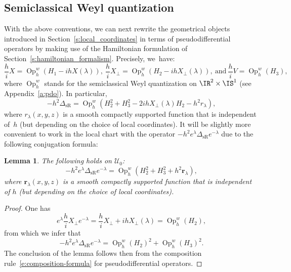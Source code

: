\documentclass[10pt]{amsart}
\theoremstyle{plain}
\newtheorem{lemm}[theo]{Lemma}
\theoremstyle{definition}
\theoremstyle{remark}
\newcommand{\Op}{\operatorname{Op}}
\begin{document}
\subsection{Semiclassical Weyl quantization}\label{ss:weyl-operators}

With the above conventions, we can next rewrite the geometrical objects introduced in Section~\ref{s:local_coordinates} in terms of pseudodifferential operators by making use of the Hamiltonian formulation of Section~\ref{s:hamiltonian_formalism}. Precisely, we~have:
\[
\frac{h}{i}X=\Op_h^w(H_1-ih X(\lambda)),\ \frac{h}{i}X_\perp=\Op_h^w(H_2-ihX_\perp(\lambda)),\ \text{and}\ \frac{h}{i}V=\Op_h^w(H_3),
\]
where $\Op_h^w$ stands for the semiclassical Weyl quantization on $\IR^2\times\IS^1$ (see Appendix~\ref{a:pdo}). In particular,
\begin{equation}%
-h^2\Delta_{\text{sR}}=\Op^w_h(H_2^2+H_3^2-2ih X_\perp(\lambda)H_2-h^2r_\lambda),
\end{equation}
where $r_\lambda(x,y,z)$ is a smooth compactly supported function that is independent of~$h$ (but depending on the choice of local coordinates). It will be slightly more convenient to work in the local chart with the operator $-h^2e^{\lambda}\Delta_{\text{sR}}e^{-\lambda}$ due to the following conjugation formula:

\begin{lemm}
The following holds on $\mathcal{U}_0$:
\begin{equation}%
-h^2e^{\lambda}\Delta_{\operatorname{sR}}e^{-\lambda}=\Op_h^w(H_2^2+H_3^2+h^2\boldsymbol{r}_\lambda),
\end{equation}
where $\boldsymbol{r}_\lambda(x,y,z)$ is a smooth compactly supported function that is independent of $h$ (but depending on the choice of local coordinates).
\end{lemm}

\begin{proof} One has
\[
e^{\lambda}\frac{h}{i}X_\perp e^{-\lambda}=\frac{h}{i}X_\perp+ihX_\perp(\lambda)=\Op_h^w(H_2),
\]
from which we infer that
\[
-h^2e^{\lambda}\Delta_{\operatorname{sR}}e^{-\lambda}=\Op_h^w(H_2)^2+\Op_h^w(H_3)^2.
\]
The conclusion of the lemma follows then from the composition rule~\eqref{e:composition-formula} for pseudodifferential operators.
\end{proof}
\end{document}
